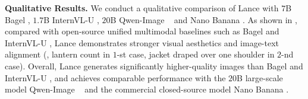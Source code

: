 \textbf{Qualitative Results.}
We conduct a qualitative comparison of Lance with $7$B Bagel \cite{deng2025emerging}, $1.7$B InternVL-U \cite{tian2026internvlu}, $20$B Qwen-Image  ~\cite{wu2025qwen} and Nano Banana \cite{Gemini3pro}. 
As shown in , compared with open-source unified multimodal baselines such as Bagel \cite{deng2025emerging} and InternVL-U \cite{tian2026internvlu}, Lance demonstrates stronger visual aesthetics and image-text alignment (\eg, lantern count in $1$-st case,
jacket draped over one shoulder in $2$-nd case).
Overall, Lance generates significantly higher-quality images than Bagel \cite{deng2025emerging} and InternVL-U \cite{tian2026internvlu}, and achieves comparable performance with the $20$B large-scale model Qwen-Image  ~\cite{wu2025qwen} and the commercial closed-source model Nano Banana \cite{Gemini3pro}.





